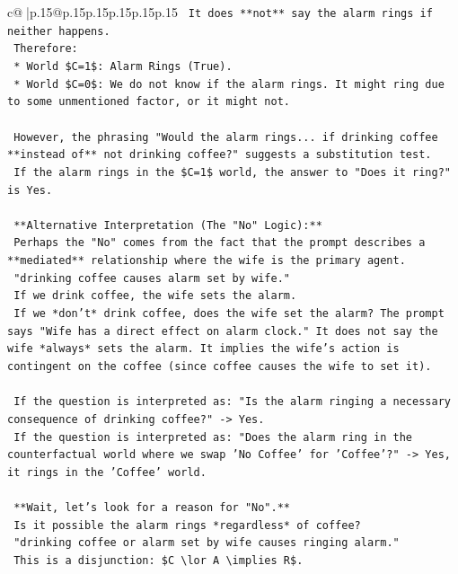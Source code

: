 \documentclass{article}
\begin{document}
{\begin{supertabular}{c@{$\;$}|p{.15\linewidth}@{}p{.15\linewidth}p{.15\linewidth}p{.15\linewidth}p{.15\linewidth}p{.15\linewidth}}
{{{\texttt{        It does **not** say the alarm rings if neither happens.} \\
\texttt{        Therefore:} \\
\texttt{        *   World \$C=1\$: Alarm Rings (True).} \\
\texttt{        *   World \$C=0\$: We do not know if the alarm rings. It might ring due to some unmentioned factor, or it might not.} \\
\\ 
\texttt{        However, the phrasing "Would the alarm rings... if drinking coffee **instead of** not drinking coffee?" suggests a substitution test.} \\
\texttt{        If the alarm rings in the \$C=1\$ world, the answer to "Does it ring?" is Yes.} \\
\\ 
\texttt{        **Alternative Interpretation (The "No" Logic):**} \\
\texttt{        Perhaps the "No" comes from the fact that the prompt describes a **mediated** relationship where the wife is the primary agent.} \\
\texttt{        "drinking coffee causes alarm set by wife."} \\
\texttt{        If we drink coffee, the wife sets the alarm.} \\
\texttt{        If we *don't* drink coffee, does the wife set the alarm? The prompt says "Wife has a direct effect on alarm clock." It does not say the wife *always* sets the alarm. It implies the wife's action is contingent on the coffee (since coffee causes the wife to set it).} \\
\\ 
\texttt{        If the question is interpreted as: "Is the alarm ringing a necessary consequence of drinking coffee?" {-}> Yes.} \\
\texttt{        If the question is interpreted as: "Does the alarm ring in the counterfactual world where we swap 'No Coffee' for 'Coffee'?" {-}> Yes, it rings in the 'Coffee' world.} \\
\\ 
\texttt{        **Wait, let's look for a reason for "No".**} \\
\texttt{        Is it possible the alarm rings *regardless* of coffee?} \\
\texttt{        "drinking coffee or alarm set by wife causes ringing alarm."} \\
\texttt{        This is a disjunction: \$C \textbackslash{}lor A \textbackslash{}implies R\$.} \\
}}}
\end{supertabular}}
\end{document}
